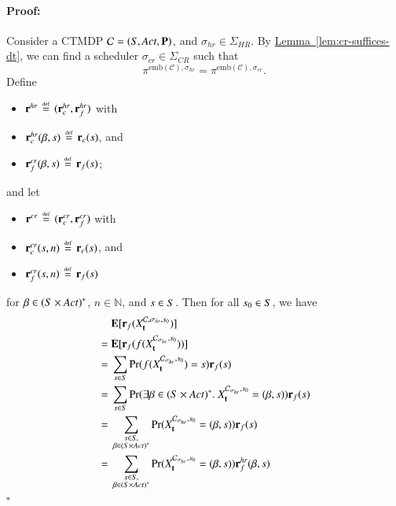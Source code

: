 \documentclass[10pt,twocolumn]{article}
\newenvironment{proof}{\paragraph{Proof:}}{\hfill$\square$}
\DeclareMathOperator{\prob}{Pr}
\newcommand{\states} {{\ensuremath S}}
\newcommand{\state}  {{\ensuremath s}}
\newcommand{\nats}    {{\ensuremath {\mathbb{N}}}}
\newcommand{\acts}{\mathit{Act}}
\newcommand{\pmat}{\mathbf{P}}
\newcommand{\cmodel}{\mathcal{C}}
\newcommand{\mpath}{\beta}
\newcommand{\schedshr}{\Sigma_\mathit{HR}}
\newcommand{\schedscr}{\Sigma_\mathit{CR}}
\newcommand{\schedhr}{{\sigma_\mathit{hr}}}
\newcommand{\schedcr}{{\sigma_\mathit{cr}}}
\newcommand{\expect}{\mathbf{E}}
\newcommand{\rew}{\mathbf{r}}
\newcommand{\frew}{\mathbf{r}_f}
\newcommand{\crew}{\mathbf{r}_c}
\newcommand{\timeb}{\mathbf{t}}
\newcommand{\emb}{\mathrm{emb}}
\newcommand{\stopro}{X}
\newcommand{\reflem}[1]{\texorpdfstring{\hyperref[lem:#1]{Lemma~\ref*{lem:#1}}}{Lemma~\ref*{lem:#1}}}
\newcommand{\defeq}{\,\stackrel{\mbox{\rm {\tiny def}}}{=}\,}
\newcommand{\tprob}{\pi}
\begin{document}
\begin{proof}
  Consider a CTMDP $\cmodel = (\states, \acts, \pmat)$, and $\schedhr \in \schedshr$.
  By \reflem{cr-suffices-dt}, we can find a scheduler $\schedcr \in \schedscr$ such that
\begin{equation}\label{eqn:schedeqtrans}
    \tprob^{\emb(\cmodel),{\schedhr}} = \tprob^{\emb(\cmodel),\schedcr} .
  \end{equation}
Define
\begin{itemize}
  \item $\rew^\mathit{hr} \defeq (\crew^{\mathit{hr}}, \frew^{\mathit{hr}})$ with
  \item $\crew^{\mathit{hr}}(\mpath, \state) \defeq \crew(\state)$, and
  \item $\frew^{\mathit{cr}}(\mpath, \state) \defeq \frew(\state)$;
  \end{itemize}
and let
  \begin{itemize}
  \item $\rew^{\mathit{cr}} \defeq (\crew^{\mathit{cr}}, \frew^{\mathit{cr}})$ with
  \item $\crew^{\mathit{cr}}(\state, n) \defeq \crew(\state)$, and
  \item $\frew^{\mathit{cr}}(\state, n) \defeq \frew(\state)$
  \end{itemize}
for $\mpath \in (\states \times \acts)^*$, $n \in \nats$, and $\state \in \states$.
  Then for all $\state_0 \in \states$, we have
\begin{align*}
    & \expect [ \frew(\stopro^{\cmodel,\schedhr,\state_0}_\timeb) ] \\
   {} = {}& \expect [ \frew(f(\stopro^{\cmodel_{\schedhr},\state_0}_\timeb)) ] \\
   {} = {}& \sum_{\state \in \states} \prob(f(\stopro^{\cmodel_{\schedhr},\state_0}_\timeb) = \state) \frew(\state) \\
   {} = {}& \sum_{\state \in \states} \prob(\exists \mpath \in (\states \times \acts)^* .\ \stopro^{\cmodel_{\schedhr},\state_0}_\timeb = (\mpath, \state)) \frew(\state) \\
   {} = {}& \sum_{\substack{\state \in \states, \\ \mpath \in (\states \times \acts)^*}} \prob(\stopro^{\cmodel_{\schedhr},\state_0}_\timeb = (\mpath, \state)) \frew(\state) \\
   {} = {}& \sum_{\substack{\state \in \states, \\ \mpath \in (\states \times \acts)^*}} \prob(\stopro^{\cmodel_{\schedhr},\state_0}_\timeb = (\mpath, \state)) \frew^\mathit{hr}(\mpath, \state) \\

\end{align*}
\end{proof}
\end{document}
